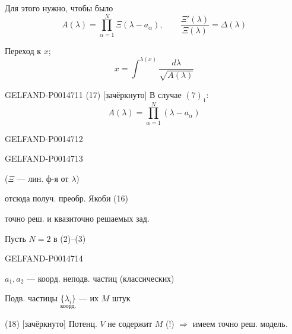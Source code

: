 Для этого нужно, чтобы было
\begin{equation*}
A(\lambda)=\prod_{\alpha=1}^N\Xi(\lambda-a_\alpha),\qquad
\frac{\Xi'(\lambda)}{\Xi(\lambda)}=\Delta(\lambda)
\tag{15}
\end{equation*}

Переход к \(x\);
\begin{equation*}
x=\int^{\lambda(x)}\frac{d\lambda}{\sqrt{A(\lambda)}}
\tag{16}
\end{equation*}


\begin{GelfandAdjacentEvidence}{GELFAND-P001471}{1}
(17) [зачёркнуто] В случае \((7)_1\):
\[
A(\lambda)=\prod_{\alpha=1}^{N}(\lambda-a_\alpha)
\]
\end{GelfandAdjacentEvidence}
\begin{GelfandAdjacentEvidence}{GELFAND-P001471}{2}


\end{GelfandAdjacentEvidence}
\begin{GelfandAdjacentEvidence}{GELFAND-P001471}{3}


(\(\boxed{\Xi}\) — лин. ф-я от \(\lambda\))

отсюда получ. преобр. Якоби (16)

точно реш. и квазиточно решаемых зад.

Пусть \(N=2\) в (2)–(3)

\end{GelfandAdjacentEvidence}
\begin{GelfandAdjacentEvidence}{GELFAND-P001471}{4}


\(a_1,a_2\) — коорд. неподв. частиц (классических)

Подв. частицы \(\underset{\text{коорд.}}{\{\lambda_i\}}\) — их \(M\) штук

(18) [зачёркнуто] Потенц. \(V\) не содержит \(M\) (!) \(\Longrightarrow\) имеем точно реш. модель.

\end{GelfandAdjacentEvidence}
